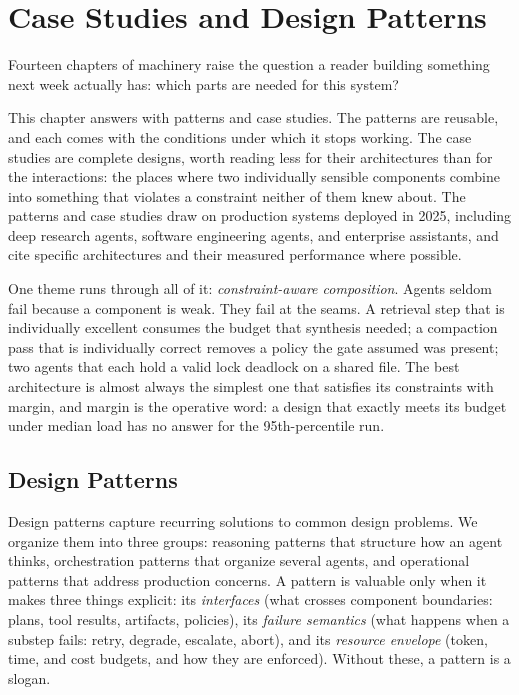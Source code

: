 \documentclass[11pt]{book}
\begin{document}

\chapter{Case Studies and Design Patterns}
\label{ch:patterns}

Fourteen chapters of machinery raise the question a reader building something next week actually has: which parts are needed for this system?

This chapter answers with patterns and case studies. The patterns are reusable, and each comes with the conditions under which it stops working. The case studies are complete designs, worth reading less for their architectures than for the interactions: the places where two individually sensible components combine into something that violates a constraint neither of them knew about. The patterns and case studies draw on production systems deployed in 2025, including deep research agents, software engineering agents, and enterprise assistants, and cite specific architectures and their measured performance where possible.

One theme runs through all of it: \textit{constraint-aware composition}. Agents seldom fail because a component is weak. They fail at the seams. A retrieval step that is individually excellent consumes the budget that synthesis needed; a compaction pass that is individually correct removes a policy the gate assumed was present; two agents that each hold a valid lock deadlock on a shared file. The best architecture is almost always the simplest one that satisfies its constraints with margin, and margin is the operative word: a design that exactly meets its budget under median load has no answer for the 95th-percentile run.

\section{Design Patterns}

Design patterns capture recurring solutions to common design problems. We organize them into three groups: reasoning patterns that structure how an agent thinks, orchestration patterns that organize several agents, and operational patterns that address production concerns. A pattern is valuable only when it makes three things explicit: its \textit{interfaces} (what crosses component boundaries: plans, tool results, artifacts, policies), its \textit{failure semantics} (what happens when a substep fails: retry, degrade, escalate, abort), and its \textit{resource envelope} (token, time, and cost budgets, and how they are enforced). Without these, a pattern is a slogan.
\end{document}
